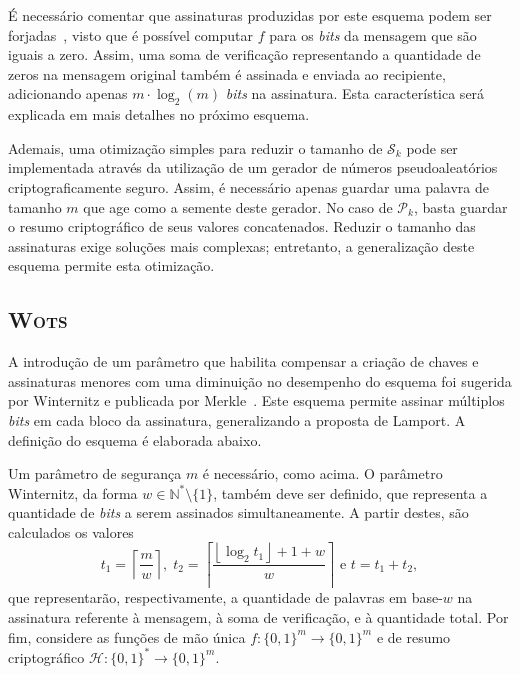 \documentclass{ufsctex/ufsctex}
\newcommand{\hh}{\mathcal{H}}
\newcommand{\pk}{\mathcal{P}_{k}}
\newcommand{\sk}{\mathcal{S}_{k}}
\newcommand{\binwds}[1]{\{0, 1\}^{#1}}
\newcommand{\fhash}[1]{\hh{}: \binwds{*} \longrightarrow{} \binwds{#1}}
\newcommand{\wots}{\textsc{Wots}}
\begin{document}
É necessário comentar que assinaturas produzidas por este esquema podem ser
forjadas~\cite[Capítulo 3]{Merkle:inproc:1989:aug}, visto que é possível
computar $f$ para os \emph{bits} da mensagem que são iguais a zero. Assim, uma
soma de verificação representando a quantidade de zeros na mensagem original
também é assinada e enviada ao recipiente, adicionando apenas $m \cdot
\log_2(m)$ \emph{bits} na assinatura. Esta característica será explicada em
mais detalhes no próximo esquema.

Ademais, uma otimização simples para reduzir o tamanho de $\sk{}$ pode ser
implementada através da utilização de um gerador de números pseudoaleatórios
criptograficamente seguro. Assim, é necessário apenas guardar uma palavra de
tamanho $m$ que age como a semente deste gerador. No caso de $\pk{}$, basta
guardar o resumo criptográfico de seus valores concatenados. Reduzir o tamanho
das assinaturas exige soluções mais complexas; entretanto, a generalização
deste esquema permite esta otimização.

\subsection{\wots{}}\label{subsection:wots}

A introdução de um parâmetro que habilita compensar a criação de chaves e
assinaturas menores com uma diminuição no desempenho do esquema foi sugerida
por Winternitz e publicada por Merkle~\cite[Capítulo
5]{Merkle:inproc:1989:aug}. Este esquema permite assinar múltiplos \emph{bits}
em cada bloco da assinatura, generalizando a proposta de Lamport. A definição
do esquema é elaborada abaixo.

Um parâmetro de segurança $m$ é necessário, como acima. O parâmetro Winternitz,
da forma $w \in \mathbb{N}^{*}\setminus\{1\}$, também deve ser definido, que
representa a quantidade de \emph{bits} a serem assinados simultaneamente. A
partir destes, são calculados os valores \[t_{1} = \left\lceil \frac{m}{w}
\right\rceil, \; t_{2} = \left\lceil \frac{\left\lfloor \log_2 t_{1}
\right\rfloor + 1 + w}{w} \right\rceil \text{ e } t = t_{1} + t_{2},\] que
representarão, respectivamente, a quantidade de palavras em base-$w$ na
assinatura referente à mensagem, à soma de verificação, e à quantidade total.
Por fim, considere as funções de mão única $f : \binwds{m} \longrightarrow
\binwds{m}$ e de resumo criptográfico $\fhash{m}$.
\end{document}
